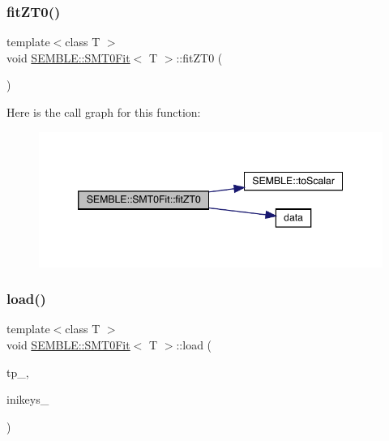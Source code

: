 \mbox{\label{structSEMBLE_1_1SMT0Fit_aae2f42a0b663e58a7458dee2b7a954f2}} 
\subsubsection{\texorpdfstring{fitZT0()}{fitZT0()}\hspace{0.1cm}{\footnotesize\ttfamily [2/2]}}
{\footnotesize\ttfamily template$<$class T $>$ \\
void \mbox{\hyperlink{structSEMBLE_1_1SMT0Fit}{S\+E\+M\+B\+L\+E\+::\+S\+M\+T0\+Fit}}$<$ T $>$\+::fit\+Z\+T0 (\begin{DoxyParamCaption}\item[{void}]{ }\end{DoxyParamCaption})}

Here is the call graph for this function\+:
\nopagebreak
\begin{figure}[H]
\begin{center}
\leavevmode
\includegraphics[width=346pt]{d6/dad/structSEMBLE_1_1SMT0Fit_aae2f42a0b663e58a7458dee2b7a954f2_cgraph}
\end{center}
\end{figure}
\mbox{\label{structSEMBLE_1_1SMT0Fit_a082e12f3695d20ca6acb97d221c30ad1}} 
\subsubsection{\texorpdfstring{load()}{load()}\hspace{0.1cm}{\footnotesize\ttfamily [1/2]}}
{\footnotesize\ttfamily template$<$class T $>$ \\
void \mbox{\hyperlink{structSEMBLE_1_1SMT0Fit}{S\+E\+M\+B\+L\+E\+::\+S\+M\+T0\+Fit}}$<$ T $>$\+::load (\begin{DoxyParamCaption}\item[{const typename std\+::vector$<$ \mbox{\hyperlink{structSEMBLE_1_1SembleMatrix}{Semble\+Matrix}}$<$ T $>$ $>$ \&}]{tp\+\_\+,  }\item[{const Fit\+Ini\+Props\+\_\+t \&}]{inikeys\+\_\+ }\end{DoxyParamCaption})}

